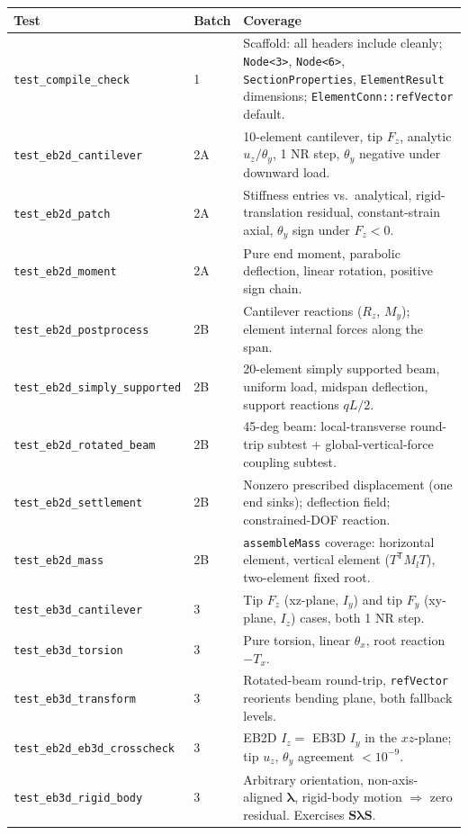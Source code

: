 \documentclass[11pt,a4paper]{book}
\newcommand{\bmath}[1]{\boldsymbol{#1}}
\newcommand{\Sdiag}{\bmath{S}}
\newcommand{\lam}{\bmath{\lambda}}
\begin{document}
\begin{longtable}{p{4.5cm} l p{8cm}}
\toprule
Test & Batch & Coverage \\
\midrule \endhead
\texttt{test\_compile\_check}        & 1  & Scaffold: all headers include cleanly; \texttt{Node<3>}, \texttt{Node<6>}, \texttt{SectionProperties}, \texttt{ElementResult} dimensions; \texttt{ElementConn::refVector} default. \\
\texttt{test\_eb2d\_cantilever}      & 2A & 10-element cantilever, tip $F_z$, analytic $u_z / \theta_y$, 1 NR step, $\theta_y$ negative under downward load. \\
\texttt{test\_eb2d\_patch}           & 2A & Stiffness entries vs.\ analytical, rigid-translation residual, constant-strain axial, $\theta_y$ sign under $F_z<0$. \\
\texttt{test\_eb2d\_moment}          & 2A & Pure end moment, parabolic deflection, linear rotation, positive sign chain. \\
\texttt{test\_eb2d\_postprocess}     & 2B & Cantilever reactions ($R_z$, $M_y$); element internal forces along the span. \\
\texttt{test\_eb2d\_simply\_supported}& 2B & 20-element simply supported beam, uniform load, midspan deflection, support reactions $qL/2$. \\
\texttt{test\_eb2d\_rotated\_beam}   & 2B & 45-deg beam: local-transverse round-trip subtest + global-vertical-force coupling subtest. \\
\texttt{test\_eb2d\_settlement}      & 2B & Nonzero prescribed displacement (one end sinks); deflection field; constrained-DOF reaction. \\
\texttt{test\_eb2d\_mass}            & 2B & \texttt{assembleMass} coverage: horizontal element, vertical element ($T^\mathsf{T} M_l T$), two-element fixed root. \\
\texttt{test\_eb3d\_cantilever}      & 3  & Tip $F_z$ (xz-plane, $I_y$) and tip $F_y$ (xy-plane, $I_z$) cases, both 1 NR step. \\
\texttt{test\_eb3d\_torsion}         & 3  & Pure torsion, linear $\theta_x$, root reaction $-T_x$. \\
\texttt{test\_eb3d\_transform}       & 3  & Rotated-beam round-trip, \texttt{refVector} reorients bending plane, both fallback levels. \\
\texttt{test\_eb2d\_eb3d\_crosscheck}& 3  & EB2D $I_z = $ EB3D $I_y$ in the $xz$-plane; tip $u_z$, $\theta_y$ agreement $<10^{-9}$. \\
\texttt{test\_eb3d\_rigid\_body}     & 3  & Arbitrary orientation, non-axis-aligned $\lam$, rigid-body motion $\Rightarrow$ zero residual. Exercises $\Sdiag\lam\Sdiag$. \\

\end{longtable}
\end{document}
